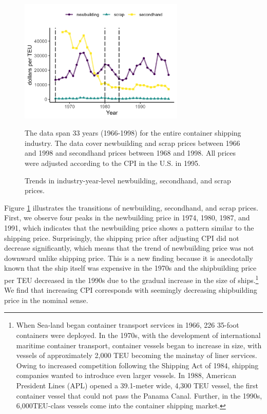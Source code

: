 \documentclass[11pt]{article}
\begin{document}
\begin{figure}[!ht]
\begin{center}
\includegraphics[width = 0.7\textwidth]{figuretable/price_newbuilding_secondhand_scrap.png}
\caption{Trends in industry-year-level newbuilding, secondhand, and scrap prices.}
\label{fg:price_newbuilding_secondhand_scrap}
\end{center}
\footnotesize
The data span 33 years (1966-1998) for the entire container shipping industry. The data cover newbuilding and scrap prices between 1966 and 1998 and secondhand prices between 1968 and 1998. All prices were adjusted according to the CPI in the U.S. in 1995. 
\end{figure}

Figure \ref{fg:price_newbuilding_secondhand_scrap} illustrates the transitions of newbuilding, secondhand, and scrap prices. First, we observe four peaks in the newbuilding price in 1974, 1980, 1987, and 1991, which indicates that the newbuilding price shows a pattern similar to the shipping price. Surprisingly, the shipping price after adjusting CPI did not decrease significantly, which means that the trend of newbuilding price was not downward unlike shipping price. This is a new finding because it is anecdotally known that the ship itself was expensive in the 1970s and the shipbuilding price per TEU decreased in the 1990s due to the gradual increase in the size of ships.\footnote{When Sea-land began container transport services in 1966, 226 35-foot containers were deployed. In the 1970s, with the development of international maritime container transport, container vessels began to increase in size, with vessels of approximately 2,000 TEU becoming the mainstay of liner services. Owing to increased competition following the Shipping Act of 1984, shipping companies wanted to introduce even larger vessels. In 1988, American President Lines (APL) opened a 39.1-meter wide, 4,300 TEU vessel, the first container vessel that could not pass the Panama Canal. Further, in the 1990s, 6,000TEU-class vessels come into the container shipping market.} We find that increasing CPI corresponds with seemingly decreasing shipbuilding price in the nominal sense. 
\end{document}
